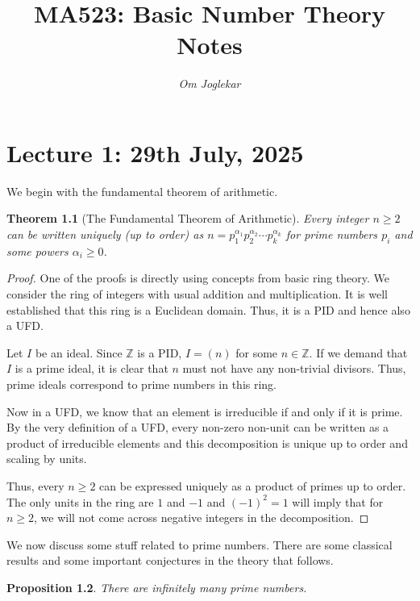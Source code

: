\documentclass[10pt,openany]{book}
\newtheorem{theorem}{Theorem}[chapter]
\newtheorem{proposition}[theorem]{Proposition}
\theoremstyle{italicnonumber}
\theoremstyle{definition}
\newcommand{\Z}{\mathbb{Z}}
\begin{document}
\title{MA523: Basic Number Theory Notes}

\author{\emph{Om Joglekar}}
\date{}
\maketitle

\tableofcontents

\chapter{Lecture 1: 29th July, 2025}

We begin with the fundamental theorem of arithmetic.

\begin{theorem} [The Fundamental Theorem of Arithmetic] \label{funda_arithmetic}
  Every integer $n \geq 2$ can be written uniquely (up to order) as $n=p_1^{\alpha_1} p_2^{\alpha_2} \cdots p_k^{\alpha_k}$ for prime numbers $p_i$ and some powers $\alpha_i \geq 0$.
\end{theorem}

\begin{proof}
  One of the proofs is directly using concepts from basic ring theory. We consider the ring of integers with usual addition and multiplication. It is well established that this ring is a Euclidean domain. Thus, it is a PID and hence also a UFD.

  Let $I$ be an ideal. Since $\Z$ is a PID, $I=(n)$ for some $n \in \Z$. If we demand that $I$ is a prime ideal, it is clear that $n$ must not have any non-trivial divisors. Thus, prime ideals correspond to prime numbers in this ring.

  Now in a UFD, we know that an element is irreducible if and only if it is prime. By the very definition of a UFD, every non-zero non-unit can be written as a product of irreducible elements and this decomposition is unique up to order and scaling by units.

  Thus, every $n \geq 2$ can be expressed uniquely as a product of primes up to order. The only units in the ring are $1$ and $-1$ and $(-1)^2=1$ will imply that for $n \geq 2$, we will not come across negative integers in the decomposition.
\end{proof}

We now discuss some stuff related to prime numbers. There are some classical results and some important conjectures in the theory that follows.

\begin{proposition}
  There are infinitely many prime numbers.
\end{proposition}
\end{document}
